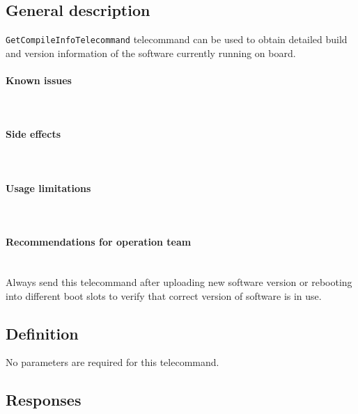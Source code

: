 

\subsection{General description}
\texttt{GetCompileInfoTelecommand} telecommand can be used to obtain detailed build and version information of the software currently running on board.

\paragraph{Known issues} \mbox{} \\
\None

\paragraph{Side effects} \mbox{} \\
\None

\paragraph{Usage limitations} \mbox{} \\
\None

\paragraph{Recommendations for operation team} \mbox{} \\
Always send this telecommand after uploading new software version or rebooting into different boot slots to verify that correct version of \obc software is in use.

\subsection{Definition}

No parameters are required for this telecommand.

\subsection{Responses}

